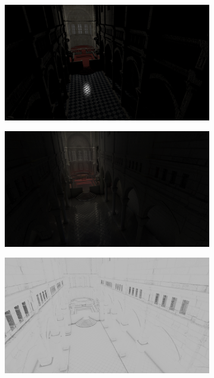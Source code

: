 \begin{figure}[H]
	\centering
	\begin{subfigure}[t]{.49\linewidth}
		\centering
		\captionsetup{justification=centering}
		\includegraphics[width=\linewidth]{media/finals/sibenik_direct.png}
	\end{subfigure}%
	\hspace{0.01\textwidth}
	\begin{subfigure}[t]{.49\linewidth}
		\centering
		\captionsetup{justification=centering}
		\includegraphics[width=\linewidth]{media/finals/sibenik_indirect.png}
	\end{subfigure}%
	\par\smallskip
	\begin{subfigure}[t]{.49\linewidth}
		\centering
		\captionsetup{justification=centering}
		\includegraphics[width=\linewidth]{media/finals/sibenik_ao.png}

\end{subfigure}
\end{figure}
